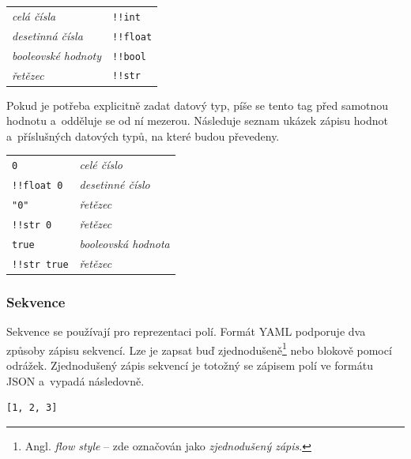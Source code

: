\documentclass[FM,bw,DP]{tulthesis}
\begin{document}
\vspace{8pt}
\begin{tabular}{m{5cm}@{}l}
\textit{celá čísla}\dotfill & \texttt{!!int} \\
\textit{desetinná čísla}\dotfill & \texttt{!!float}  \\
\textit{booleovské hodnoty}\dotfill & \texttt{!!bool}\\
\textit{řetězec}\dotfill & \texttt{!!str} \\
\end{tabular}
\vspace{8pt}

Pokud je potřeba explicitně zadat datový typ, píše se tento tag před samotnou hodnotu a~odděluje se od ní mezerou. Následuje seznam ukázek zápisu hodnot a~příslušných datových typů, na které budou převedeny.

\vspace{-2pt}
\setlength\LTleft\parindent
\begin{longtable}{m{5cm}@{}l}
\texttt{0}\dotfill & \textit{celé číslo} \\
\texttt{!!float 0}\dotfill & \textit{desetinné číslo} \\
\texttt{"0"}\dotfill & \textit{řetězec} \\
\texttt{!!str 0}\dotfill & \textit{řetězec} \\
\texttt{true}\dotfill & \textit{booleovská hodnota} \\
\texttt{!!str true}\dotfill & \textit{řetězec} \\
\end{longtable}
\vspace{-15pt}

\subsubsection*{Sekvence}

Sekvence se používají pro reprezentaci polí. Formát \gls{YAML} podporuje dva způsoby zápisu sekvencí. Lze je zapsat buď zjednodušeně\footnote{Angl. \textit{flow style} -- zde označován jako \textit{zjednodušený zápis}.} nebo blokově pomocí odrážek. Zjednodušený zápis sekvencí je totožný se zápisem polí ve formátu \gls{JSON} a~vypadá následovně.

\lstset{style=short}

\vspace{5pt}
\begin{lstlisting}
[1, 2, 3]
\end{lstlisting}
\vspace*{-20pt}
\end{document}
